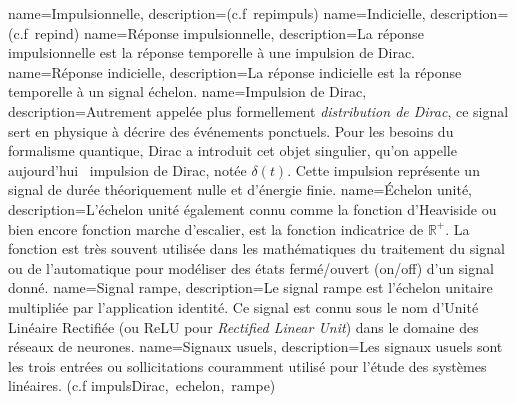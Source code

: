 %
{%
  name={Impulsionnelle},%
  description={(c.f~\gls{repimpuls})}
}
%
{%
  name={Indicielle},%
  description={(c.f~\gls{repind})}
}
%
{%
  name={Réponse impulsionnelle},%
  description={La réponse impulsionnelle est la réponse temporelle
  à une impulsion de Dirac.
  }
}
%
{%
  name={Réponse indicielle},%
  description={La réponse indicielle est la réponse temporelle
  à un signal échelon.
  }
}
%
{%
  name={Impulsion de Dirac},%
  description={Autrement appelée plus formellement \emph{distribution de Dirac}, 
               ce signal sert en physique à décrire des événements ponctuels. 
               Pour les besoins du formalisme quantique, Dirac a introduit cet objet 
               singulier, qu'on appelle aujourd'hui \og~impulsion de Dirac\fg, notée $\delta(t)$. 
               Cette impulsion représente un signal de durée théoriquement nulle 
               et d'énergie finie.}
}
%
{%
  name={\'Echelon unité},%
  description={L'échelon unité également connu comme 
              la fonction d'Heaviside ou bien encore fonction marche 
              d'escalier, est la fonction indicatrice de $\mathbb{R}^+$.
              La fonction est très souvent utilisée dans les mathématiques 
              du traitement du signal ou de l'automatique pour modéliser 
              des états fermé/ouvert (\og on/off\fg) d'un signal donné.}
}
%
{%
  name={Signal rampe},%
  description={Le signal rampe est l'échelon unitaire multipliée par 
               l'application identité. Ce signal est connu sous le 
               nom d'Unité Linéaire Rectifiée 
               (ou ReLU pour \emph{Rectified Linear Unit}) dans
               le domaine des réseaux de neurones.}
}
%
{%
  name={Signaux usuels},%
  description={Les signaux usuels sont les trois entrées ou sollicitations
              couramment utilisé pour l'étude des systèmes linéaires. 
              (c.f \gls{impulsDirac},~\gls{echelon},~\gls{rampe})}
}
